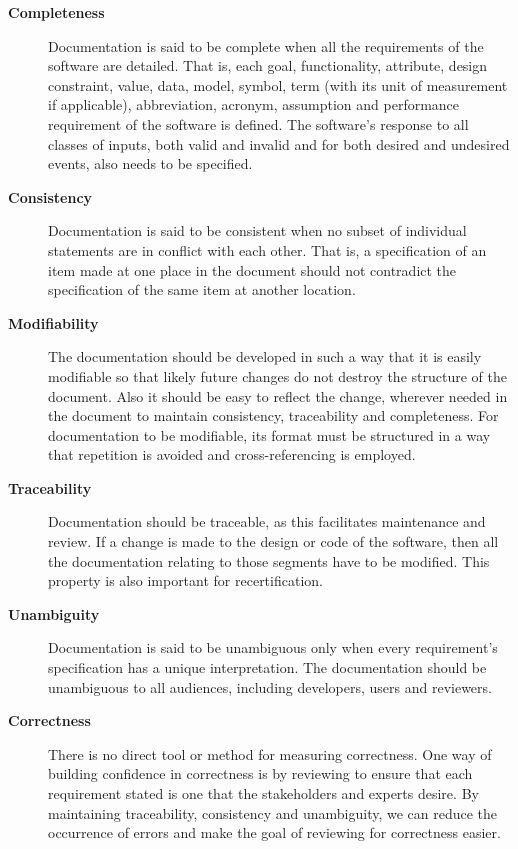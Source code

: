 \documentclass[12pt]{article}
\begin{document}
\begin{description}

\item [\textbf{Completeness}] Documentation is said to be complete when all the
  requirements of the software are detailed. That is, each goal, functionality,
  attribute, design constraint, value, data, model, symbol, term (with its unit
  of measurement if applicable), abbreviation, acronym, assumption and
  performance requirement of the software is defined.  The software's response
  to all classes of inputs, both valid and invalid and for both desired and
  undesired events, also needs to be specified.

\item [\textbf{Consistency}] Documentation is said to be consistent when no subset
  of individual statements are in conflict with each other. That is, a
  specification of an item made at one place in the document should not
  contradict the specification of the same item at another location.

\item [\textbf{Modifiability}] The documentation should be developed in such a way
  that it is easily modifiable so that likely future changes do not destroy the
  structure of the document. Also it should be easy to reflect the change,
  wherever needed in the document to maintain consistency, traceability and
  completeness. For documentation to be modifiable, its format must be
  structured in a way that repetition is avoided and cross-referencing is
  employed.

\item [\textbf{Traceability}] Documentation should be traceable, as this
  facilitates maintenance and review. If a change is made to the design or code
  of the software, then all the documentation relating to those segments have to
  be modified.  This property is also important for recertification.

\item [\textbf{Unambiguity}] Documentation is said to be unambiguous only when
  every requirement's specification has a unique interpretation.  The
  documentation should be unambiguous to all audiences, including developers,
  users and reviewers.

\item [\textbf{Correctness}] There is no direct tool or method for measuring
  correctness. One way of building confidence in correctness is by reviewing to
  ensure that each requirement stated is one that the stakeholders and experts
  desire.  By maintaining traceability, consistency and unambiguity, we can
  reduce the occurrence of errors and make the goal of reviewing for correctness
  easier.


\end{description}
\end{document}
